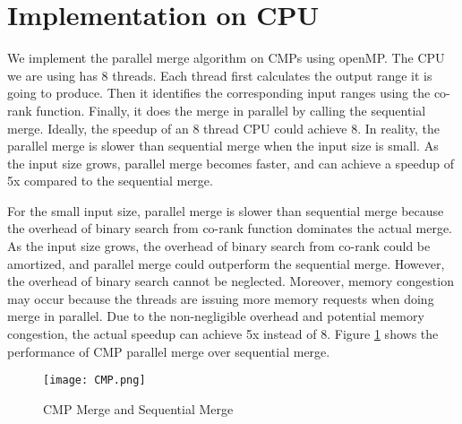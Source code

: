 
    \section{Implementation on CPU}\label{sect:CPU}
    We implement the parallel merge algorithm on CMPs using openMP. 
    The CPU we are using has 8 threads. Each thread first calculates the output 
    range it is going to produce. Then it identifies the corresponding input ranges 
    using the co-rank function. 
    Finally, it does the merge in parallel by calling the sequential merge. 
    Ideally, the speedup of an 8 thread CPU could achieve 8. 
    In reality, the parallel merge is slower than sequential merge when the input size 
    is small. As the input size grows, parallel merge becomes faster, and can achieve a 
    speedup of 5x compared to the sequential merge.  
    
    For the small input size, parallel merge is slower than sequential merge because the 
    overhead of binary search from co-rank function dominates the actual merge. 
    As the input size grows, the overhead of binary search from co-rank could be amortized,
    and parallel merge could outperform the sequential merge. 
    However, the overhead of binary search cannot be neglected. 
    Moreover, memory congestion may occur because 
    the threads are issuing more memory requests when doing merge in parallel. Due to the
    non-negligible overhead and potential memory congestion, the actual speedup can achieve
    5x instead of 8. 
    Figure \ref{fig:CMP} shows the performance of CMP parallel merge over sequential merge.  

    \begin{figure}[!th]
    \begin{center}
    \texttt{[image: CMP.png]}
    \end{center}
    \caption{{\label{fig:CMP}} CMP Merge and Sequential Merge}
    \end{figure}


